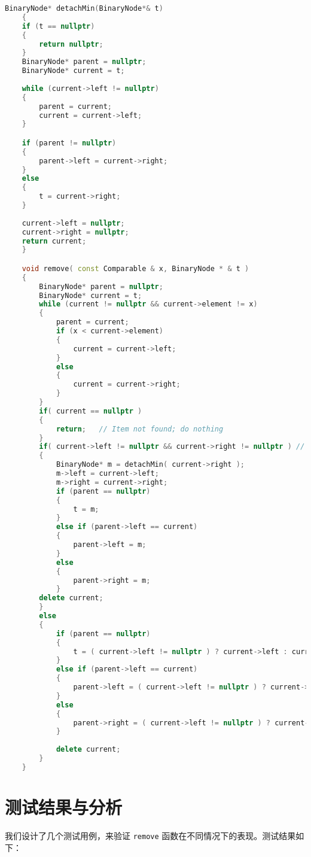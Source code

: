 \documentclass{article}
\begin{document}
\begin{lstlisting}[language=C++]
    BinaryNode* detachMin(BinaryNode*& t) 
    {
    if (t == nullptr)
    {
        return nullptr;
    }
    BinaryNode* parent = nullptr;
    BinaryNode* current = t;
    
    while (current->left != nullptr) 
    {
        parent = current;
        current = current->left;
    }

    if (parent != nullptr) 
    {
        parent->left = current->right; 
    }
    else 
    {
        t = current->right; 
    }
    
    current->left = nullptr;
    current->right = nullptr;
    return current; 
    }

    void remove( const Comparable & x, BinaryNode * & t )
    {
        BinaryNode* parent = nullptr;
        BinaryNode* current = t;
        while (current != nullptr && current->element != x) 
        {
            parent = current;
            if (x < current->element) 
            {
                current = current->left;
            } 
            else 
            {
                current = current->right;
            }
        }
        if( current == nullptr )
        {    
            return;   // Item not found; do nothing
        }
        if( current->left != nullptr && current->right != nullptr ) // Two children
        {
            BinaryNode* m = detachMin( current->right );
            m->left = current->left;
            m->right = current->right;
            if (parent == nullptr)
            {
                t = m; 
            } 
            else if (parent->left == current) 
            {
                parent->left = m;
            } 
            else 
            {
                parent->right = m;
            }
        delete current;
        }
        else
        {
            if (parent == nullptr)
            {
                t = ( current->left != nullptr ) ? current->left : current->right;
            } 
            else if (parent->left == current)
            {
                parent->left = ( current->left != nullptr ) ? current->left : current->right;                
            }
            else 
            {
                parent->right = ( current->left != nullptr ) ? current->left : current->right;
            }
            
            delete current;
        }
    }
\end{lstlisting}

\section{测试结果与分析}
我们设计了几个测试用例，来验证 \texttt{remove} 函数在不同情况下的表现。测试结果如下：
\end{document}
